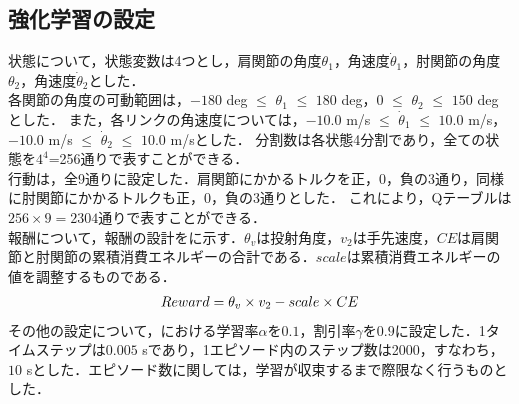 \begin{small}
\subsection{強化学習の設定}
状態について，状態変数は4つとし，肩関節の角度$\theta_{1}$，角速度$\dot{\theta}_{1}$，肘関節の角度$\theta_{2}$，角速度$\dot{\theta}_{2}$とした．\\
各関節の角度の可動範囲は，$-180$ deg $\le$ $\theta_{1}$ $\le$ $180$ deg，$0$ $\le$ $\theta_{2}$ $\le$ $150$ deg\cite{range}とした．
また，各リンクの角速度については，$-10.0$ m/s $\le$ $\dot{\theta}_{1}$ $\le$ $10.0$ m/s，$-10.0$ m/s $\le$ $\dot{\theta}_{2}$ $\le$ $10.0$ m/sとした．
分割数は各状態4分割であり，全ての状態を$4^{4}$=256通りで表すことができる．\\
行動は，全9通りに設定した．肩関節にかかるトルクを正，0，負の3通り，同様に肘関節にかかるトルクも正，0，負の3通りとした．
これにより，Qテーブルは$256 \times 9=2304$通りで表すことができる．\\
報酬について，報酬の設計をに示す．$\theta_{v}$は投射角度，$v_{2}$は手先速度，$CE$は肩関節と肘関節の累積消費エネルギーの合計である．$scale$は累積消費エネルギーの値を調整するものである．
\begin{eqnarray}
  \equlabel{6}
  Reward = \theta_{v} \times v_{2} - scale \times CE
\end{eqnarray}
その他の設定について，における学習率$\alpha$を$0.1$，割引率$\gamma$を$0.9$に設定した．1タイムステップは$0.005$ sであり，1エピソード内のステップ数は2000，すなわち，$10$ sとした．エピソード数に関しては，学習が収束するまで際限なく行うものとした．

\end{small}
